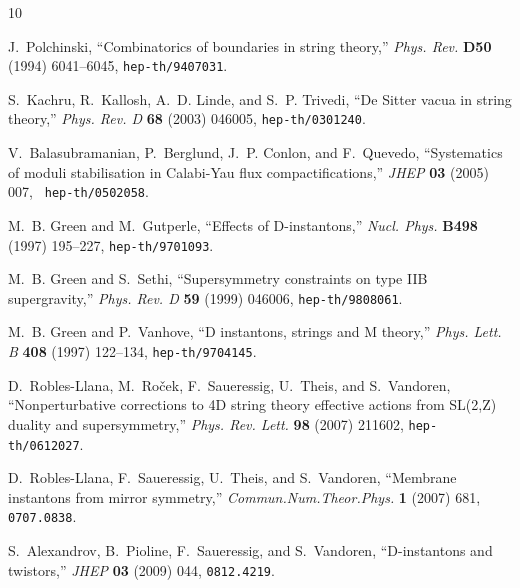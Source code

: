 \documentclass[12pt,a4paper]{article}
\begin{document}
\providecommand{\href}[2]{#2}\begingroup\raggedright\begin{thebibliography}{10}
	
	J.~Polchinski, ``{Combinatorics of boundaries in string theory},'' {\em Phys.
		Rev.} {\bf D50} (1994) 6041--6045,
	\href{http://www.arXiv.org/abs/hep-th/9407031}{{\tt hep-th/9407031}}.
	
	S.~Kachru, R.~Kallosh, A.~D. Linde, and S.~P. Trivedi, ``{De Sitter vacua in
		string theory},'' {\em Phys. Rev. D} {\bf 68} (2003) 046005,
	\href{http://www.arXiv.org/abs/hep-th/0301240}{{\tt hep-th/0301240}}.
	
	V.~Balasubramanian, P.~Berglund, J.~P. Conlon, and F.~Quevedo, ``{Systematics
		of moduli stabilisation in Calabi-Yau flux compactifications},'' {\em JHEP}
	{\bf 03} (2005) 007, \href{http://www.arXiv.org/abs/hep-th/0502058}{{\tt
			hep-th/0502058}}.
	
	M.~B. Green and M.~Gutperle, ``{Effects of D-instantons},'' {\em Nucl. Phys.}
	{\bf B498} (1997) 195--227,
	\href{http://www.arXiv.org/abs/hep-th/9701093}{{\tt hep-th/9701093}}.
	
	M.~B. Green and S.~Sethi, ``{Supersymmetry constraints on type IIB
		supergravity},'' {\em Phys. Rev. D} {\bf 59} (1999) 046006,
	\href{http://www.arXiv.org/abs/hep-th/9808061}{{\tt hep-th/9808061}}.
	
	M.~B. Green and P.~Vanhove, ``{D instantons, strings and M theory},'' {\em
		Phys. Lett. B} {\bf 408} (1997) 122--134,
	\href{http://www.arXiv.org/abs/hep-th/9704145}{{\tt hep-th/9704145}}.
	
	D.~Robles-Llana, M.~Ro\v{c}ek, F.~Saueressig, U.~Theis, and S.~Vandoren,
	``{Nonperturbative corrections to 4D string theory effective actions from
		SL(2,Z) duality and supersymmetry},'' {\em Phys. Rev. Lett.} {\bf 98} (2007)
	211602,
	\href{http://www.arXiv.org/abs/hep-th/0612027}{{\tt hep-th/0612027}}.
	
	D.~Robles-Llana, F.~Saueressig, U.~Theis, and S.~Vandoren, ``{Membrane
		instantons from mirror symmetry},'' {\em Commun.Num.Theor.Phys.} {\bf 1}
	(2007) 681, \href{http://www.arXiv.org/abs/0707.0838}{{\tt 0707.0838}}.
	
	S.~Alexandrov, B.~Pioline, F.~Saueressig, and S.~Vandoren, ``{D-instantons and
		twistors},'' {\em JHEP} {\bf 03} (2009) 044,
	\href{http://www.arXiv.org/abs/0812.4219}{{\tt 0812.4219}}.
	

\end{thebibliography}
\end{document}
